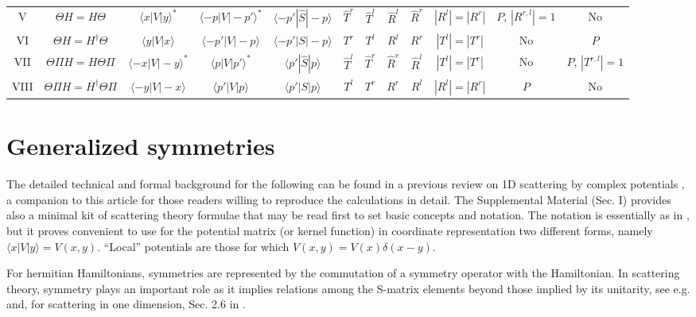 \begin{landscape}
\begin{table}
{\begin{tabular}{cccccccccccc}
      \\
      V & $\Theta H=H\Theta$ &  $\langle x|V|y\rangle^*$& $\langle -p|V|-p'\rangle^*$ & $\langle -p'|\widehat{S}|-p\rangle$ & $\widehat{T}^r$ & $\widehat{T}^l$ & $\widehat{R}^l$& $\widehat{R}^r$
      &$|R^l|=|R^r|$&$P$, $|R^{r,l}|=1$&No
      \\
      VI & $\Theta H=H^\dagger\Theta$ &  $\langle y|V|x\rangle$& $\langle -p'|V|-p\rangle$ & $\langle -p'|S|-p\rangle$ & $T^r$& $T^l$ & $R^l$& $R^r$&$|T^l| = |T^r|$&No&$P$
      \\
      VII & $\Theta\Pi H=H\Theta \Pi$ &  $\langle -x|V|-y\rangle^*$ & $\langle p|V|p'\rangle^*$ & $\langle p'|\widehat{S}|p\rangle$ &$\widehat{T}^l$& $\widehat{T}^r$ & $\widehat{R}^r$& $\widehat{R}^l$&$|T^l|=|T^r|$&No&$P$, $|T^{r,l}|=1$
      \\
      VIII& $\Theta\Pi H=H^\dagger \Theta \Pi$ &  $\langle -y|V|-x\rangle$ & $\langle p'|V|p\rangle$ & $\langle p'|S|p\rangle$ & $T^l$ & $T^r$ & $R^r$ & $R^l$&$|R^l|=|R^r|$&$P$&No
    \end{tabular}}
  \end{table}
\end{landscape}





\section{Generalized symmetries}


The detailed technical and formal background for the following can be found in
a previous review on 1D scattering by complex potentials \cite{Muga2004}, a companion to this article
for those readers willing to reproduce the calculations in detail.
The Supplemental Material (Sec. I)  provides also a minimal kit of scattering theory formulae that may be
read first to set basic concepts and notation.
The notation is essentially as in \cite{Muga2004}, but it proves convenient to use
for the potential matrix (or kernel function) in coordinate representation
two different forms, namely $\langle x|V|y\rangle=V(x,y)$. ``Local'' potentials are those
for which $V(x,y)=V(x)\delta(x-y)$.



%
For hermitian  Hamiltonians, symmetries are represented by the commutation of
a symmetry operator with the Hamiltonian.
In scattering theory, symmetry plays an important role  as it implies relations among
the S-matrix elements beyond those implied by its unitarity, see e.g. \cite{Taylor1972} and, for scattering in one dimension,
Sec. 2.6 in \cite{Muga2004}.


